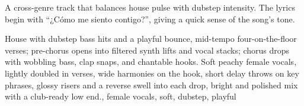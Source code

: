 

\begin{notes}
A cross-genre track that balances house pulse with dubstep intensity. %
The lyrics begin with “¿Cómo me siento contigo?”, giving a quick sense of the song’s tone.
\end{notes}

\begin{style}
House with dubstep bass hits and a playful bounce, mid-tempo four-on-the-floor verses; pre-chorus opens into filtered synth lifts and vocal stacks; chorus drops with wobbling bass, clap snaps, and chantable hooks. %
Soft peachy female vocals, lightly doubled in verses, wide harmonies on the hook, short delay throws on key phrases, glossy risers and a reverse swell into each drop, bright and polished mix with a club-ready low end., female vocals, soft, dubstep, playful
\end{style}

